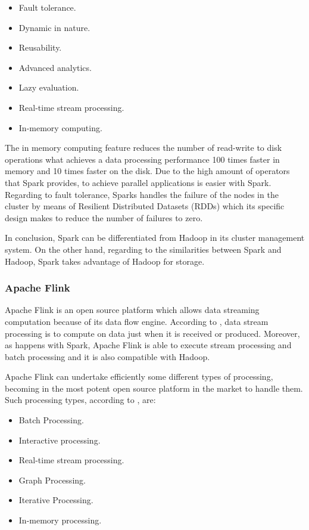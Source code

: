 \begin{itemize}

\item Fault tolerance.
\item Dynamic in nature.
\item Reusability.
\item Advanced analytics.
\item Lazy evaluation.
\item Real-time stream processing.
\item In-memory computing.

\end{itemize}

The in memory computing feature reduces the number of read-write to disk operations what achieves a data processing performance 100 times faster in memory and 10 times faster on the disk. Due to the high amount of operators that Spark provides, to achieve parallel applications is easier with Spark. Regarding to fault tolerance, Sparks handles the failure of the nodes in the cluster by means of Resilient Distributed Datasets (RDDs) which its specific design makes to reduce the number of failures to zero.

In conclusion, Spark can be differentiated from Hadoop in its cluster management system. On the other hand, regarding to the similarities between Spark and Hadoop, Spark takes advantage of Hadoop for storage.

\subsubsection{Apache Flink}

Apache Flink is an open source platform which allows data streaming computation because of its data flow engine. According to \cite{streamprocessing}, data stream processing is to compute on data just when it is received or produced. Moreover, as happens with Spark, Apache Flink is able to execute stream processing and batch processing and it is also compatible with Hadoop.

Apache Flink can undertake efficiently some different types of processing, becoming in the most potent open source platform in the market to handle them. Such processing types, according to \cite{flinkwebsite}, are:

\begin{itemize}

\item Batch Processing.
\item Interactive processing.
\item Real-time stream processing.
\item Graph Processing.
\item Iterative Processing.
\item In-memory processing.

\end{itemize}

